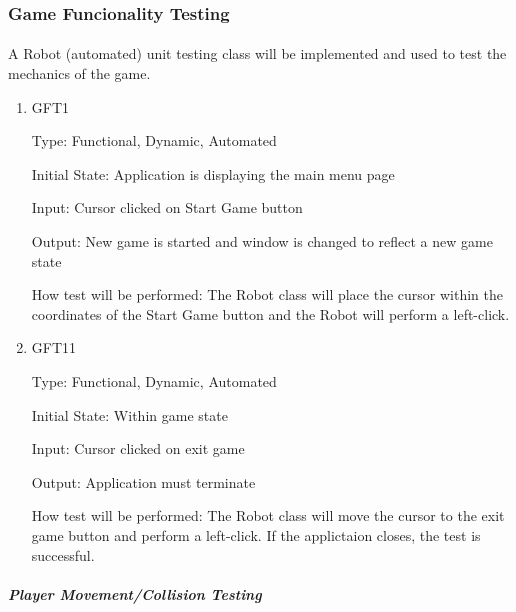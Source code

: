 \documentclass[12pt, titlepage]{article}
\begin{document}
\subsubsection{Game Funcionality Testing}
		
\paragraph{}
A Robot (automated) unit testing class will be implemented and used to test the mechanics of the game.

\begin{enumerate}

\item{GFT1\\}

Type: Functional, Dynamic, Automated
					
Initial State: Application is displaying the main menu page
					
Input: Cursor clicked on Start Game button
					
Output: New game is started and window is changed to reflect a new game state
					
How test will be performed: The Robot class will place the cursor within the coordinates of the Start Game button and the Robot will perform a left-click.

\item{GFT11\\}

Type: Functional, Dynamic, Automated
					
Initial State: Within game state
					
Input: Cursor clicked on exit game
					
Output: Application must terminate

How test will be performed: The Robot class will move the cursor to the exit game button and perform a left-click. If the applictaion closes, the test is successful.

\end{enumerate}

\subparagraph{Player Movement/Collision Testing}
\end{document}
